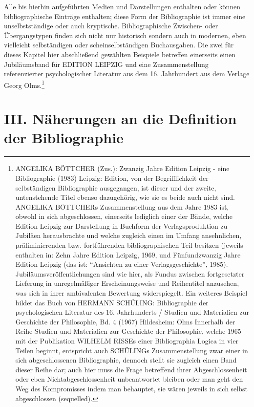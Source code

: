 \documentclass[a4paper,
fontsize=11pt,
oneside,
numbers=noperiodatend,
parskip=half-,
bibliography=totoc,
final
]{scrartcl}
\begin{document}
Alle bis hierhin aufgeführten Medien und Darstellungen enthalten oder
können bibliographische Einträge enthalten; diese Form der Bibliographie
ist immer eine unselbstständige oder auch kryptische. Bibliographische
Zwischen- oder Übergangstypen finden sich nicht nur historisch sondern
auch in modernen, eben vielleicht selbständigen oder scheinselbständigen
Buchausgaben. Die zwei für dieses Kapitel hier abschließend gewählten
Beispiele betreffen einerseits einen Jubiläumsband für EDITION LEIPZIG
und eine Zusammenstellung referenzierter psychologischer Literatur aus
dem 16. Jahrhundert aus dem Verlage Georg Olms.\footnote{ANGELIKA
  BÖTTCHER (Zus.): Zwanzig Jahre Edition Leipzig - eine Bibliographie
  (1983) Leipzig: Edition, von der Begrifflichkeit der selbständigen
  Bibliographie ausgegangen, ist dieser und der zweite, untenstehende
  Titel ebenso dazugehörig, wie sie es beide auch nicht sind. ANGELIKA
  BÖTTCHERs Zusammenstellung aus dem Jahre 1983 ist, obwohl in sich
  abgeschlossen, einerseits lediglich einer der Bände, welche Edition
  Leipzig zur Darstellung in Buchform der Verlagsproduktion zu Jubiläen
  herausbrachte und welche zugleich einen im Umfang ansehnlichen,
  präliminierenden bzw. fortführenden bibliographischen Teil besitzen
  (jeweils enthalten in: Zehn Jahre Edition Leipzig, 1969, und
  Fünfundzwanzig Jahre Edition Leipzig (das ist: \enquote{Ansichten zu
  einer Verlagsgeschichte}, 1985). Jubiläumsveröffentlichungen sind wie
  hier, als Fundus zwischen fortgesetzter Lieferung in unregelmäßiger
  Erscheinungsweise und Reihentitel anzusehen, was sich in ihrer
  ambivalenten Bewertung widerspiegelt. Ein weiteres Beispiel bildet das
  Buch von HERMANN SCHÜLING: Bibliographie der psychologischen Literatur
  des 16. Jahrhunderts / Studien und Materialien zur Geschichte der
  Philosophie, Bd. 4 (1967) Hildesheim: Olms Innerhalb der Reihe Studien
  und Materialien zur Geschichte der Philosophie, welche 1965 mit der
  Publikation WILHELM RISSEs einer Bibliographia Logica in vier Teilen
  beginnt, entspricht auch SCHÜLINGs Zusammenstellung zwar einer in sich
  abgeschlossenen Bibliographie, dennoch stellt sie zugleich einen Band
  dieser Reihe dar; auch hier muss die Frage betreffend ihrer
  Abgeschlossenheit oder eben Nichtabgeschlossenheit unbeantwortet
  bleiben oder man geht den Weg des Kompromisses indem man behauptet,
  sie wären jeweils in sich selbst abgeschlossen (sequelled).}

\section*{III. Näherungen an die Definition der
Bibliographie}\label{iii.-nuxe4herungen-an-die-definition-der-bibliographie}
\end{document}
